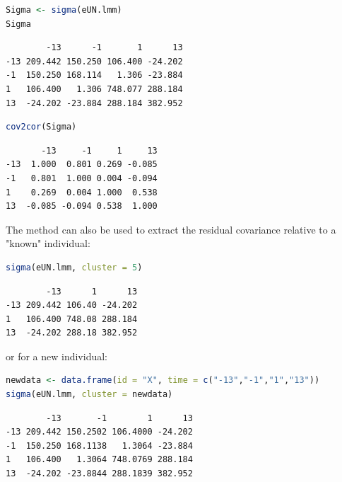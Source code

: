 \documentclass[12pt]{article}
\begin{document}
\begin{minipage}{0.45\linewidth}
\begin{lstlisting}[language=r,numbers=none]
Sigma <- sigma(eUN.lmm)
Sigma
\end{lstlisting}

\label{}
\begin{verbatim}
        -13      -1       1      13
-13 209.442 150.250 106.400 -24.202
-1  150.250 168.114   1.306 -23.884
1   106.400   1.306 748.077 288.184
13  -24.202 -23.884 288.184 382.952
\end{verbatim}

\end{minipage}
\begin{minipage}{0.05\linewidth}
\hphantom{x}
\end{minipage}
\begin{minipage}{0.45\linewidth}
\begin{lstlisting}[language=r,numbers=none]
cov2cor(Sigma)
\end{lstlisting}

\label{}
\begin{verbatim}
       -13     -1     1     13
-13  1.000  0.801 0.269 -0.085
-1   0.801  1.000 0.004 -0.094
1    0.269  0.004 1.000  0.538
13  -0.085 -0.094 0.538  1.000
\end{verbatim}

\end{minipage}

The method can also be used to extract the residual covariance
relative to a "known" individual:
\begin{lstlisting}[language=r,numbers=none]
sigma(eUN.lmm, cluster = 5)
\end{lstlisting}

\label{}
\begin{verbatim}
        -13      1      13
-13 209.442 106.40 -24.202
1   106.400 748.08 288.184
13  -24.202 288.18 382.952
\end{verbatim}


or for a new individual:
\begin{lstlisting}[language=r,numbers=none]
newdata <- data.frame(id = "X", time = c("-13","-1","1","13"))
sigma(eUN.lmm, cluster = newdata)
\end{lstlisting}

\label{}
\begin{verbatim}
        -13       -1        1      13
-13 209.442 150.2502 106.4000 -24.202
-1  150.250 168.1138   1.3064 -23.884
1   106.400   1.3064 748.0769 288.184
13  -24.202 -23.8844 288.1839 382.952
\end{verbatim}
\end{document}
